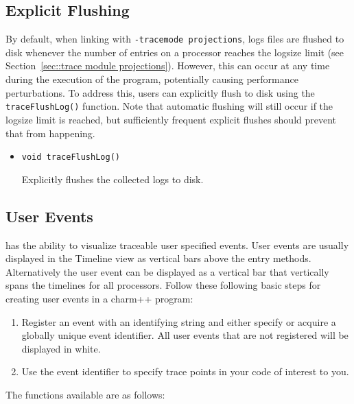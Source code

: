 \subsection{Explicit Flushing}
\label{sec::explicit flushing}

By default, when linking with {\tt -tracemode projections}, logs files
are flushed to disk whenever the number of entries on a processor
reaches the logsize limit (see Section~\ref{sec::trace module
projections}). However, this can occur at any time during the execution
of the program, potentially causing performance perturbations. To
address this, users can explicitly flush to disk using the {\tt
traceFlushLog()} function.  Note that automatic flushing will
still occur if the logsize limit is reached, but sufficiently frequent
explicit flushes should prevent that from happening.

\begin{itemize}
\item
{\tt void traceFlushLog()}

Explicitly flushes the collected logs to disk.

\end{itemize}

\subsection{User Events}
\label{sec::user events}

\projections{} has the ability to visualize traceable user
specified events. User events are usually displayed in the Timeline view as vertical bars above the entry methods. Alternatively the user event can be displayed as a vertical bar that vertically spans the timelines for all processors. Follow these following basic steps for creating user events in a charm++ program:

\begin{enumerate}
\item
Register an event with an identifying string and either specify or acquire
a globally unique event identifier. All user events that are not registered will be displayed in white.

\item
Use the event identifier to specify trace points in your code of interest to you.
\end{enumerate}

The functions available are as follows:

